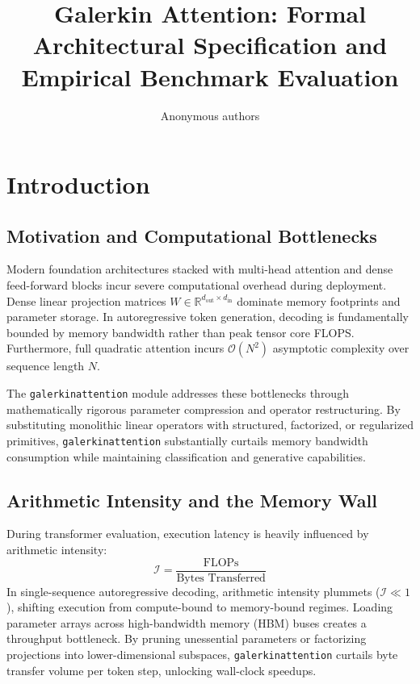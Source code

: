 \title{\textbf{Galerkin Attention: Formal Architectural Specification and Empirical Benchmark Evaluation}}

\author{Anonymous authors}


\section{Introduction}

\subsection{Motivation and Computational Bottlenecks}
Modern foundation architectures stacked with multi-head attention and dense feed-forward blocks incur severe computational overhead during deployment. Dense linear projection matrices $W \in \mathbb{R}^{d_{\text{out}} \times d_{\text{in}}}$ dominate memory footprints and parameter storage. In autoregressive token generation, decoding is fundamentally bounded by memory bandwidth rather than peak tensor core FLOPS. Furthermore, full quadratic attention incurs $\mathcal{O}(N^2)$ asymptotic complexity over sequence length $N$.

The \texttt{galerkinattention} module addresses these bottlenecks through mathematically rigorous parameter compression and operator restructuring. By substituting monolithic linear operators with structured, factorized, or regularized primitives, \texttt{galerkinattention} substantially curtails memory bandwidth consumption while maintaining classification and generative capabilities.

\subsection{Arithmetic Intensity and the Memory Wall}
During transformer evaluation, execution latency is heavily influenced by arithmetic intensity:
\[
\mathcal{I} = \frac{\text{FLOPs}}{\text{Bytes Transferred}}
\]
In single-sequence autoregressive decoding, arithmetic intensity plummets ($\mathcal{I} \ll 1$), shifting execution from compute-bound to memory-bound regimes. Loading parameter arrays across high-bandwidth memory (HBM) buses creates a throughput bottleneck. By pruning unessential parameters or factorizing projections into lower-dimensional subspaces, \texttt{galerkinattention} curtails byte transfer volume per token step, unlocking wall-clock speedups.


